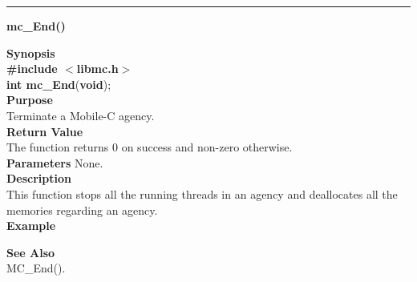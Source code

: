 \noindent
\vspace{5pt}
\rule{6.5in}{0.015in}
\noindent
{}
{\LARGE \bf mc\_End()}\\

\noindent
{\bf Synopsis}\\
{\bf \#include $<$libmc.h$>$}\\
{\bf int mc\_End}({\bf void});\\

\noindent
{\bf Purpose}\\
Terminate a Mobile-C agency.\\

\noindent
{\bf Return Value}\\
The function returns 0 on success and non-zero otherwise.\\

\noindent
{\bf Parameters}
\vspace{-0.1in}
None.\\

\noindent
{\bf Description}\\
This function stops all the running threads in an agency and deallocates all 
the memories regarding an agency.\\

\noindent
{\bf Example}\\
\noindent

\noindent
{\bf See Also}\\
MC\_End().

